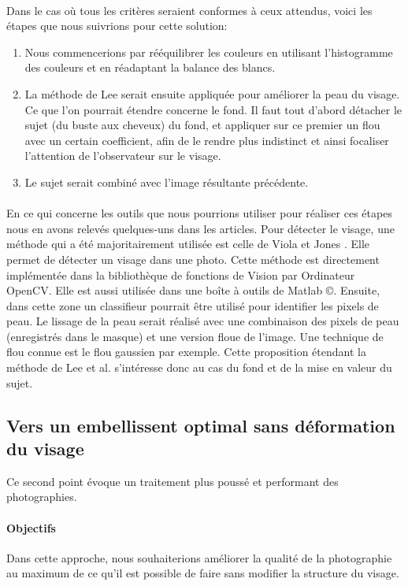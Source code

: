 \documentclass[11pt, french]{report-rd-info}
\begin{document}
\paragraph{}
Dans le cas où tous les critères seraient conformes à ceux attendus, voici les étapes que nous suivrions pour cette solution:
\begin{enumerate}
\item Nous commencerions par rééquilibrer les couleurs en utilisant l’histogramme des couleurs et en réadaptant la balance des blancs.
\item La méthode de Lee  \cite{Lee} serait ensuite appliquée pour améliorer la peau du visage. Ce que l’on pourrait étendre concerne le fond. Il faut tout d’abord détacher le sujet (du buste aux cheveux) du fond, et appliquer sur ce premier un flou avec un certain coefficient, afin de le rendre plus indistinct et ainsi focaliser l’attention de l’observateur sur le visage.
\item Le sujet serait combiné avec l’image résultante précédente.
\end{enumerate}
\paragraph{}
En ce qui concerne les outils que nous pourrions utiliser pour réaliser ces étapes nous en avons relevés quelques-uns dans les articles. Pour détecter le visage, une méthode qui a été majoritairement utilisée est celle de Viola et Jones \cite{Viola2004}. Elle permet de détecter un visage dans une photo. Cette méthode est directement implémentée dans la bibliothèque de fonctions de Vision par Ordinateur OpenCV. Elle est aussi utilisée dans une boîte à outils de Matlab \copyright. Ensuite, dans cette zone un classifieur pourrait être utilisé pour identifier les pixels de peau.
Le lissage de la peau serait réalisé avec une combinaison des pixels de peau (enregistrés dans le masque) et une version floue de l’image. Une technique de flou connue est le flou gaussien par exemple.
Cette proposition étendant la méthode de Lee et al. \cite{Lee} s’intéresse donc au cas du fond et de la mise en valeur du sujet.
\subsection{Vers un embellissent optimal sans déformation du visage}
\label{propdeux}
Ce second point évoque un traitement plus poussé et performant des photographies.
\paragraph{Objectifs}
Dans cette approche, nous souhaiterions améliorer la qualité de la photographie au maximum de ce qu’il est possible de faire sans modifier la structure du visage.
\end{document}
